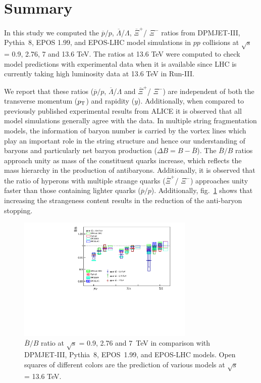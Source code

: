 \documentclass{article}
\newcommand{\sqrts}{\mbox{$\sqrt{\mathrm{s}}$}}
\newcommand{\axi}{$\overline{\Xi}^+$}
\newcommand{\xim}{$\Xi^-$}
\newcommand{\alam}{$\overline{\Lambda}$}
\newcommand{\lam}{$\Lambda$}
\newcommand{\ppt}{$p_{\rm T}$}
\begin{document}
             
\section{Summary}\label{sec4}

In this study we computed the $\overline{p}/p$, {\alam /\lam}, {\axi / \xim} ratios from DPMJET-III, Pythia~8, EPOS 1.99, and EPOS-LHC model simulations in $pp$ collisions at {\sqrts} = 0.9, 2.76, 7 and 13.6 TeV. The ratios at 13.6 TeV were computed to check model predictions with experimental data when it is available since LHC is currently taking high luminosity data at 13.6 TeV in Run-III. 

We report that these ratios ($\overline{p}/p$, {\alam /\lam} and {\axi / \xim}) are independent of both the transverse momentum ({\ppt}) and rapidity ($y$). Additionally, when compared to previously published experimental results from ALICE it is observed that all model simulations generally agree with the data. In multiple string fragmentation models, the information of baryon number is carried by the vortex lines which play an important role in the string structure and hence our understanding of baryons and particularly net baryon production ($\Delta B = B - \overline{B}$). The $\overline{B}/B$ ratios approach unity as mass of the constituent quarks increase, which reflects the mass hierarchy in the production of antibaryons. Additionally, it is observed that the ratio of hyperons with multiple strange quarks ({\axi / \xim}) approaches unity faster than those containing lighter quarks ($\overline{p}/p$). Additionally, fig.~\ref{fig7} shows that increasing the strangeness content results in the reduction of the anti-baryon stopping.

\begin{figure}[!ht]
\centering
\includegraphics[width=0.75\textwidth,height=0.35\textheight]{mean_pt.pdf}
\caption{ $\overline{B}/B$ ratio at {\sqrts} = 0.9, 2.76 and 7~TeV in comparison with DPMJET-III, Pythia~8, EPOS~1.99, and EPOS-LHC models. Open squares of different colors are the prediction of various models at {\sqrts} = 13.6 TeV. }
\label{fig7}
\end{figure}
\end{document}
